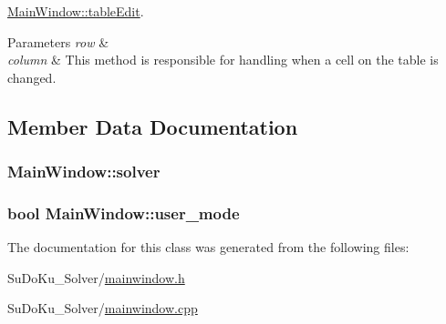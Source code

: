 \hyperlink{class_main_window_a90da512747ed1317b4553a04f054074a}{Main\+Window\+::table\+Edit}. 


\begin{DoxyParams}{Parameters}
{\em row} & \\
\hline
{\em column} & This method is responsible for handling when a cell on the table is changed. \\
\hline
\end{DoxyParams}


\subsection{Member Data Documentation}
\subsubsection[{\texorpdfstring{solver}{solver}}]{ Main\+Window\+::solver}\hypertarget{class_main_window_aec079dfef291f735a37c2df4a3b46801}{}\label{class_main_window_aec079dfef291f735a37c2df4a3b46801}
\subsubsection[{\texorpdfstring{user\+\_\+mode}{user_mode}}]{\setlength{\rightskip}{0pt plus 5cm}bool Main\+Window\+::user\+\_\+mode}\hypertarget{class_main_window_aa9bf5455d1599a2a9425c18de517a761}{}\label{class_main_window_aa9bf5455d1599a2a9425c18de517a761}


The documentation for this class was generated from the following files\+:\begin{DoxyCompactItemize}
\item 
Su\+Do\+Ku\+\_\+\+Solver/\hyperlink{mainwindow_8h}{mainwindow.\+h}\item 
Su\+Do\+Ku\+\_\+\+Solver/\hyperlink{mainwindow_8cpp}{mainwindow.\+cpp}\end{DoxyCompactItemize}
